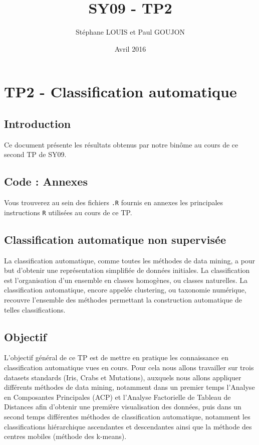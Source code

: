 \documentclass{report}
\begin{document}

\title{SY09 - TP2}
\date{Avril 2016}
\author{Stéphane LOUIS et Paul GOUJON}
\maketitle

\newpage
\tableofcontents{}

\newpage
{}
\chapter{TP2 - Classification automatique}
\section{Introduction}
Ce document présente les résultats obtenus par notre binôme au cours de ce second TP de SY09.
\section{Code : Annexes}
Vous trouverez au sein des fichiers \verb+.R+ fournis en annexes les principales instructions \verb+R+ utilisées au cours de ce TP.
\section{Classification automatique non supervisée}
La classification automatique, comme toutes les méthodes de data mining, a pour but d'obtenir une représentation simplifiée de données initiales. La classification est l'organisation d'un ensemble en classes homogènes, ou classes naturelles. La classification automatique, encore appelée clustering, ou taxonomie numérique, recouvre l'ensemble des méthodes permettant la construction automatique de telles classifications.
\section{Objectif}
L'objectif général de ce TP est de mettre en pratique les connaissance en classification automatique vues en cours. Pour cela nous allons travailler sur trois datasets standards (Iris, Crabs et Mutations), auxquels nous allons appliquer différents méthodes de data mining, notamment dans un premier temps l'Analyse en Composantes Principales (ACP) et l'Analyse Factorielle de Tableau de Distances afin d'obtenir une première visualisation des données, puis dans un second temps différentes méthodes de classification automatique, notamment les classifications hiérarchique ascendantes et descendantes ainsi que la méthode des centres mobiles (méthode des k-means).
\end{document}
